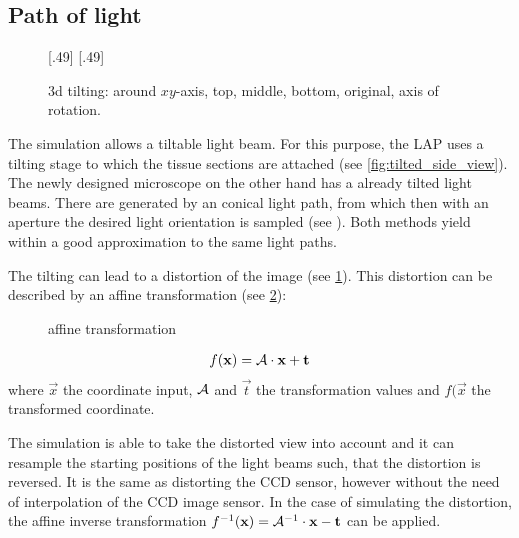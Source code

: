 \subsection{Path of light}
\label{sec:pathOfLight}
%
\begin{figure}[!t]
\setlength{\tikzheight}{0.42\textwidth}
[.49\textwidth]{
}\hfill
{}[.49\textwidth]{
}
\tikzset{external/export=false}
\caption[3d tilting]{3d tilting: around $xy$-axis, \raisebox{.25em}{\tikz \draw[red,thick](0,0)--(0.25,0);} top, \raisebox{.25em}{\tikz \draw[green,thick](0,0)--(0.25,0);} middle, \raisebox{.25em}{\tikz \draw[blue,thick](0,0)--(0.25,0);} bottom, \raisebox{.25em}{\tikz \draw[dash pattern=on 1.25pt off 1.25pt,thick](0,0)--(0.25,0);} original, \raisebox{.25em}{\tikz \draw[gray](0,0)--(0.25,0);} axis of rotation.}
\label{fig:tilting_camera_view}
\end{figure}
%
The simulation allows a tiltable light beam.
For this purpose, the \ac{LAP} uses a tilting stage to which the tissue sections are attached (see \cref{fig:tilted_side_view}).
The newly designed microscope on the other hand has a already tilted light beams.
There are generated by an conical light path, from which then with an aperture the desired light orientation is sampled (see \cite{Wiese:887678}).
Both methods yield within a good approximation to the same light paths.
\par
%
The tilting can lead to a distortion of the image (see \cref{fig:tilting_camera_view}).
This distortion can be described by an affine transformation (see \cref{fig::affine_transformation}):
%
\begin{figure}[!t]
\centering

\caption{affine transformation}
\label{fig::affine_transformation}
\end{figure}
%
\begin{align}
f(\mathbf{x}) = \mathcal{A} \cdot \mathbf{x} + \mathbf{t}
\end{align}
where $\vec{x}$ the coordinate input, $\mathcal{A}$ and $\vec{t}$ the transformation values and $f(\vec{x}$ the transformed coordinate.
\par
%
The simulation is able to take the distorted view into account and it can resample the starting positions of the light beams such, that the distortion is reversed.
It is the same as distorting the \ac{CCD} sensor, however without the need of interpolation of the \ac{CCD} image sensor.
In the case of simulating the distortion, the affine inverse transformation $f^{-1}(\mathbf{x}) = \mathcal{A}^{-1} \cdot \mathbf{x} - \mathbf{t}$ can be applied.
